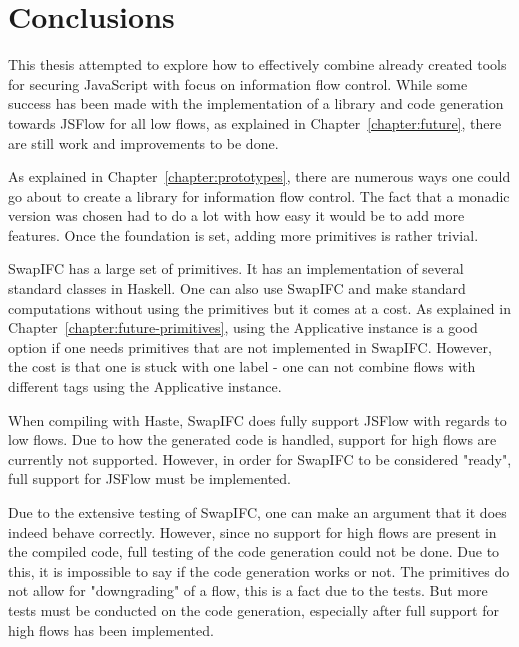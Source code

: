 \chapter{Conclusions}
This thesis attempted to explore how to effectively combine already created tools for securing JavaScript with focus on information flow control. While some success has been made with the implementation of a library and code generation towards JSFlow for all low flows, as explained in Chapter~\ref{chapter:future}, there are still work and improvements to be done.

As explained in Chapter~\ref{chapter:prototypes}, there are numerous ways one could go about to create a library for information flow control. The fact that a monadic version was chosen had to do a lot with how easy it would be to add more features. Once the foundation is set, adding more primitives is rather trivial.

SwapIFC has a large set of primitives. It has an implementation of several standard classes in Haskell. One can also use SwapIFC and make standard computations without using the primitives but it comes at a cost. As explained in Chapter~\ref{chapter:future-primitives}, using the Applicative instance is a good option if one needs primitives that are not implemented in SwapIFC. However, the cost is that one is stuck with one label - one can not combine flows with different tags using the Applicative instance.

When compiling with Haste, SwapIFC does fully support JSFlow with regards to low flows. Due to how the generated code is handled, support for high flows are currently not supported. However, in order for SwapIFC to be considered "ready", full support for JSFlow must be implemented.

Due to the extensive testing of SwapIFC, one can make an argument that it does indeed behave correctly. However, since no support for high flows are present in the compiled code, full testing of the code generation could not be done. Due to this, it is impossible to say if the code generation works or not. The primitives do not allow for "downgrading" of a flow, this is a fact due to the tests. But more tests must be conducted on the code generation, especially after full support for high flows has been implemented.

